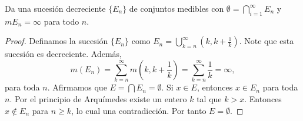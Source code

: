 \documentclass[12pt]{article}
\newenvironment{problem}[2][Problema]{\begin{trivlist}
\item[\hskip \labelsep {\bfseries #1}\hskip \labelsep {\bfseries #2.}]}{\end{trivlist}}
\begin{document}
\begin{problem}{7} Da una sucesión decreciente $\{E_n \}$ de conjuntos medibles con $\emptyset  = \bigcap_{i=1}^\infty E_n $ y $m E_n = \infty $ para todo $n$.     
\end{problem}
\begin{proof}
Definamos la sucesión $\{ E_n \}$ como $E_n = \bigcup_{k=n}^\infty (k, k +\frac{1}{k})$. Note que esta sucesión es decreciente. Además, 
$$ m(E_n) = \sum_{k=n}^\infty m \left(k, k + \frac{1}{k} \right) = \sum_{k=n}^\infty \frac{1}{k} = \infty,$$
para toda $n.$ Afirmamos que $ E = \bigcap E_n = \emptyset$. Si $x \in E$, entonces $x \in E_n$ para toda $n.$ Por el principio de Arquímedes existe un entero $k$ tal que $k > x$. Entonces $x \notin E_n$ para $n \geq k$, lo cual una contradicción. Por tanto $E = \emptyset .$
\end{proof}
\end{document}
